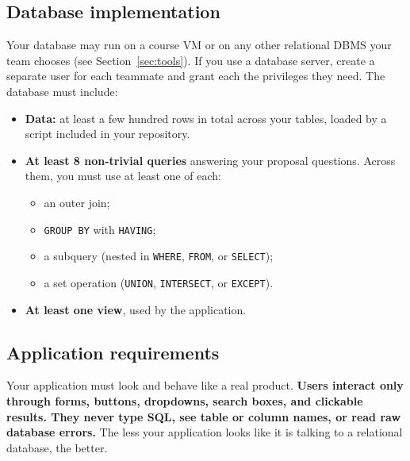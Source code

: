 \documentclass[11pt]{article}
\begin{document}
\subsection{Database implementation}

Your database may run on a course VM or on any other relational DBMS your team chooses (see Section~\ref{sec:tools}). If you use a database server, create a separate user for each teammate and grant each the privileges they need. The database must include:

\begin{itemize}
  \item \textbf{Data:} at least a few hundred rows in total across your tables, loaded by a script included in your repository.
  \item \textbf{At least 8 non-trivial queries} answering your proposal questions. Across them, you must use at least one of each:
    \begin{itemize}
      \item an outer join;
      \item \texttt{GROUP BY} with \texttt{HAVING};
      \item a subquery (nested in \texttt{WHERE}, \texttt{FROM}, or \texttt{SELECT});
      \item a set operation (\texttt{UNION}, \texttt{INTERSECT}, or \texttt{EXCEPT}).
    \end{itemize}
  \item \textbf{At least one view}, used by the application.
\end{itemize}

\subsection{Application requirements}

Your application must look and behave like a real product. \textbf{Users interact only through forms, buttons, dropdowns, search boxes, and clickable results. They never type SQL, see table or column names, or read raw database errors.} The less your application looks like it is talking to a relational database, the better.
\end{document}
